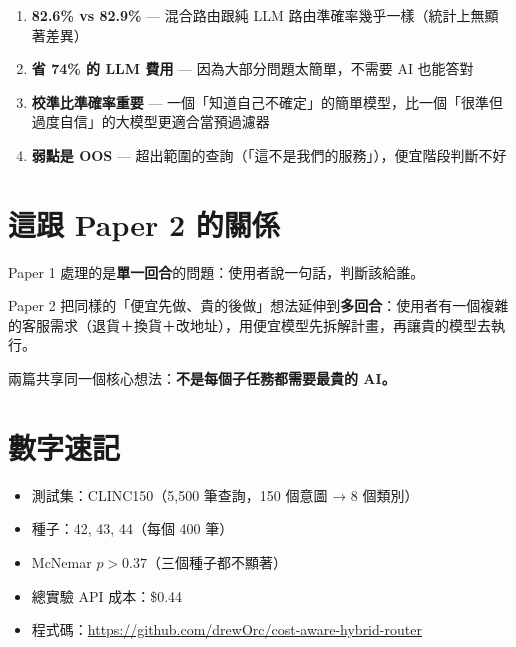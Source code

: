 \documentclass[11pt,a4paper]{article}
\begin{document}
\begin{enumerate}
\item \textbf{82.6\% vs 82.9\%} — 混合路由跟純 LLM 路由準確率幾乎一樣（統計上無顯著差異）
\item \textbf{省 74\% 的 LLM 費用} — 因為大部分問題太簡單，不需要 AI 也能答對
\item \textbf{校準比準確率重要} — 一個「知道自己不確定」的簡單模型，比一個「很準但過度自信」的大模型更適合當預過濾器
\item \textbf{弱點是 OOS} — 超出範圍的查詢（「這不是我們的服務」），便宜階段判斷不好
\end{enumerate}

\section*{這跟 Paper 2 的關係}

Paper 1 處理的是\textbf{單一回合}的問題：使用者說一句話，判斷該給誰。

Paper 2 把同樣的「便宜先做、貴的後做」想法延伸到\textbf{多回合}：使用者有一個複雜的客服需求（退貨＋換貨＋改地址），用便宜模型先拆解計畫，再讓貴的模型去執行。

兩篇共享同一個核心想法：\textbf{不是每個子任務都需要最貴的 AI。}

\section*{數字速記}

\begin{itemize}
\item 測試集：CLINC150（5,500 筆查詢，150 個意圖 → 8 個類別）
\item 種子：42, 43, 44（每個 400 筆）
\item McNemar $p > 0.37$（三個種子都不顯著）
\item 總實驗 API 成本：\$0.44
\item 程式碼：\url{https://github.com/drewOrc/cost-aware-hybrid-router}
\end{itemize}
\end{document}
